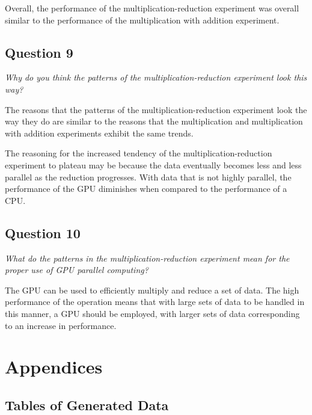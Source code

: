 \documentclass{article}
\begin{document}
Overall, the performance of the multiplication-reduction experiment was overall similar to the performance of the multiplication with addition experiment.

\subsection*{Question 9}
\textit{Why do you think the patterns of the multiplication-reduction experiment look this way?}

The reasons that the patterns of the multiplication-reduction experiment look the way they do are similar to the reasons that the multiplication and multiplication with addition experiments exhibit the same trends.

The reasoning for the increased tendency of the multiplication-reduction experiment to plateau may be because the data eventually becomes less and less parallel as the reduction progresses.  With data that is not highly parallel, the performance of the GPU diminishes when compared to the performance of a CPU.

\subsection*{Question 10}
\textit{What do the patterns in the multiplication-reduction experiment mean for the proper use of GPU parallel computing?}

The GPU can be used to efficiently multiply and reduce a set of data.  The high performance of the operation means that with large sets of data to be handled in this manner, a GPU should be employed, with larger sets of data corresponding to an increase in performance.

\newpage
\section{Appendices}
\subsection{Tables of Generated Data}
\label{app:Data}
\end{document}
